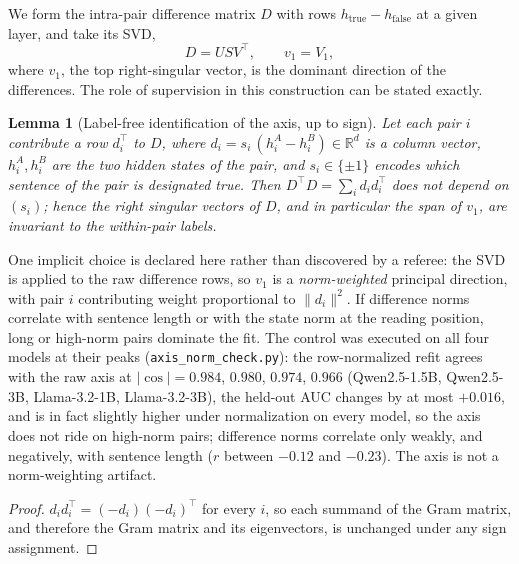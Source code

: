 \documentclass[11pt]{article}
\newtheorem{lemma}{Lemma}
\begin{document}
We form the intra-pair difference matrix $D$ with rows
$h_{\text{true}} - h_{\text{false}}$ at a given layer, and take its SVD,
\begin{equation}
D = U S V^{\top}, \qquad v_{1} = V_{1},
\end{equation}
where $v_1$, the top right-singular vector, is the dominant direction of the
differences. The role of supervision in this construction can be stated
exactly.

\begin{lemma}[Label-free identification of the axis, up to sign]
\label{lem:labels}
Let each pair $i$ contribute a row $d_i^{\top}$ to $D$, where
$d_i = s_i\,(h_i^{A} - h_i^{B}) \in \mathbb{R}^{d}$ is a column vector,
$h_i^{A}, h_i^{B}$ are the two hidden states of the pair, and
$s_i \in \{\pm 1\}$ encodes which sentence of the pair is designated true.
Then $D^{\top} D = \sum_i d_i d_i^{\top}$ does not depend on $(s_i)$; hence
the right singular vectors of $D$, and in particular the span of $v_1$, are
invariant to the within-pair labels.
\end{lemma}

One implicit choice is declared here rather than discovered by a referee:
the SVD is applied to the raw difference rows, so $v_1$ is a
\emph{norm-weighted} principal direction, with pair $i$ contributing
weight proportional to $\lVert d_i \rVert^{2}$. If difference norms
correlate with sentence length or with the state norm at the reading
position, long or high-norm pairs dominate the fit. The control was
executed on all four models at their peaks
(\texttt{axis\_norm\_check.py}): the row-normalized refit agrees with the
raw axis at $|\cos| = 0.984$, $0.980$, $0.974$, $0.966$ (Qwen2.5-1.5B,
Qwen2.5-3B, Llama-3.2-1B, Llama-3.2-3B), the held-out AUC changes by at
most $+0.016$, and is in fact slightly higher under normalization on every
model, so the axis does not ride on high-norm pairs; difference norms
correlate only weakly, and negatively, with sentence length ($r$ between
$-0.12$ and $-0.23$). The axis is not a norm-weighting artifact.


\begin{proof}
$d_i d_i^{\top} = (-d_i)(-d_i)^{\top}$ for every $i$, so each summand of the
Gram matrix, and therefore the Gram matrix and its eigenvectors, is unchanged
under any sign assignment.
\end{proof}
\end{document}
